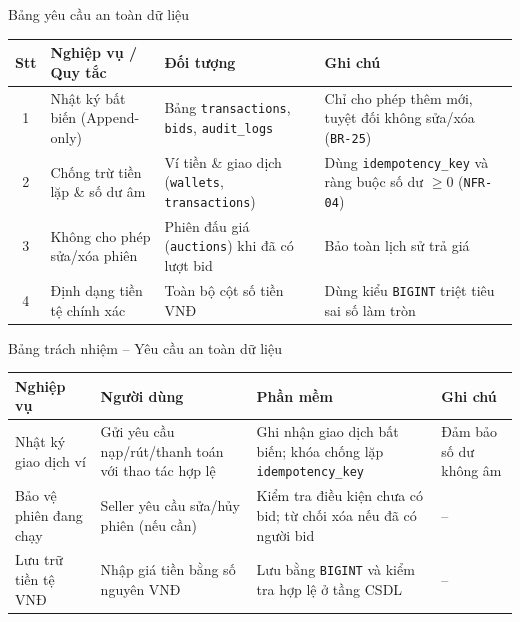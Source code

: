 \documentclass[aspectratio=169, 10pt]{beamer}
\begin{document}
\begin{frame}{Bảng yêu cầu an toàn dữ liệu}
    \footnotesize
    \begin{table}[h]
        \centering
        \begin{tabular}{c p{3.2cm} p{3.8cm} p{4.2cm}}
            \toprule
            \textbf{Stt} & \textbf{Nghiệp vụ / Quy tắc} & \textbf{Đối tượng} & \textbf{Ghi chú} \\
            \midrule
            1 & Nhật ký bất biến (Append-only) & Bảng \texttt{transactions}, \texttt{bids}, \texttt{audit\_logs} & Chỉ cho phép thêm mới, tuyệt đối không sửa/xóa (\texttt{BR-25}) \\
            \midrule
            2 & Chống trừ tiền lặp \& số dư âm & Ví tiền \& giao dịch (\texttt{wallets}, \texttt{transactions}) & Dùng \texttt{idempotency\_key} và ràng buộc số dư $\ge 0$ (\texttt{NFR-04}) \\
            \midrule
            3 & Không cho phép sửa/xóa phiên & Phiên đấu giá (\texttt{auctions}) khi đã có lượt bid & Bảo toàn lịch sử trả giá \\
            \midrule
            4 & Định dạng tiền tệ chính xác & Toàn bộ cột số tiền VNĐ & Dùng kiểu \texttt{BIGINT} triệt tiêu sai số làm tròn \\
            \bottomrule
        \end{tabular}
    \end{table}
\end{frame}

\begin{frame}{Bảng trách nhiệm -- Yêu cầu an toàn dữ liệu}
    \footnotesize
    \begin{table}[h]
        \centering
        \begin{tabular}{p{3.0cm} p{3.2cm} p{4.2cm} p{2.5cm}}
            \toprule
            \textbf{Nghiệp vụ} & \textbf{Người dùng} & \textbf{Phần mềm} & \textbf{Ghi chú} \\
            \midrule
            Nhật ký giao dịch ví & Gửi yêu cầu nạp/rút/thanh toán với thao tác hợp lệ & Ghi nhận giao dịch bất biến; khóa chống lặp \texttt{idempotency\_key} & Đảm bảo số dư không âm \\
            \midrule
            Bảo vệ phiên đang chạy & Seller yêu cầu sửa/hủy phiên (nếu cần) & Kiểm tra điều kiện chưa có bid; từ chối xóa nếu đã có người bid & -- \\
            \midrule
            Lưu trữ tiền tệ VNĐ & Nhập giá tiền bằng số nguyên VNĐ & Lưu bằng \texttt{BIGINT} và kiểm tra hợp lệ ở tầng CSDL & -- \\
            \bottomrule
        \end{tabular}
    \end{table}
\end{frame}
\end{document}
